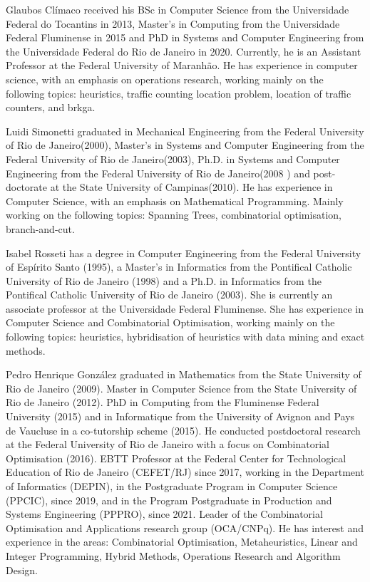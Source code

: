 \documentclass{singlecol-new}
\theoremstyle{TH}{
\newtheorem{lemma}{Lemma}
\newtheorem{theorem}[lemma]{Theorem}
\newtheorem{corrolary}[lemma]{Corrolary}
\newtheorem{conjecture}[lemma]{Conjecture}
\newtheorem{proposition}[lemma]{Proposition}
\newtheorem{claim}[lemma]{Claim}
\newtheorem{stheorem}[lemma]{Wrong Theorem}
}
\theoremstyle{THrm}{
\newtheorem{definition}{Definition}[section]
\newtheorem{question}{Question}[section]
\newtheorem{remark}{Remark}
\newtheorem{scheme}{Scheme}
}
\theoremstyle{THhit}{
\newtheorem{case}{Case}[section]
}
\begin{document}
\begin{bio}
Glaubos Clímaco received his BSc in Computer Science
from the Universidade Federal do Tocantins in 2013, Master’s in Computing
from the Universidade Federal Fluminense in 2015 and PhD in Systems and
Computer Engineering from the Universidade Federal do Rio de Janeiro in
2020. Currently, he is an Assistant Professor at the Federal University of
Maranhão. He has experience in computer science, with an emphasis on
operations research, working mainly on the following topics: heuristics, traffic
counting location problem, location of traffic counters, and brkga. 

\noindent Luidi Simonetti graduated in Mechanical Engineering from the Federal University of Rio de Janeiro(2000), Master's in Systems and Computer Engineering from the Federal University of Rio de Janeiro(2003), Ph.D. in Systems and Computer Engineering from the Federal University of Rio de Janeiro(2008 ) and post-doctorate at the State University of Campinas(2010). He has experience in Computer Science, with an emphasis on Mathematical Programming. Mainly working on the following topics: Spanning Trees, combinatorial optimisation, branch-and-cut. 

\noindent Isabel Rosseti has a degree in Computer Engineering from the Federal University of Espírito Santo (1995), a Master's in Informatics from the Pontifical Catholic University of Rio de Janeiro (1998) and a Ph.D. in Informatics from the Pontifical Catholic University of Rio de Janeiro (2003). She is currently an associate professor at the Universidade Federal Fluminense. She has experience in Computer Science and Combinatorial Optimisation, working mainly on the following topics: heuristics, hybridisation of heuristics with data mining and exact methods.

\noindent Pedro Henrique González graduated in Mathematics from the State University of Rio de Janeiro (2009). Master in Computer Science from the State University of Rio de Janeiro (2012). PhD in Computing from the Fluminense Federal University (2015) and in Informatique from the University of Avignon and Pays de Vaucluse in a co-tutorship scheme (2015). He conducted postdoctoral research at the Federal University of Rio de Janeiro with a focus on Combinatorial Optimisation (2016). EBTT Professor at the Federal Center for Technological Education of Rio de Janeiro (CEFET/RJ) since 2017, working in the Department of Informatics (DEPIN), in the Postgraduate Program in Computer Science (PPCIC), since 2019, and in the Program Postgraduate in Production and Systems Engineering (PPPRO), since 2021. Leader of the Combinatorial Optimisation and Applications research group (OCA/CNPq). He has interest and experience in the areas: Combinatorial Optimisation, Metaheuristics, Linear and Integer Programming, Hybrid Methods, Operations Research and Algorithm Design.


\end{bio}
\end{document}
